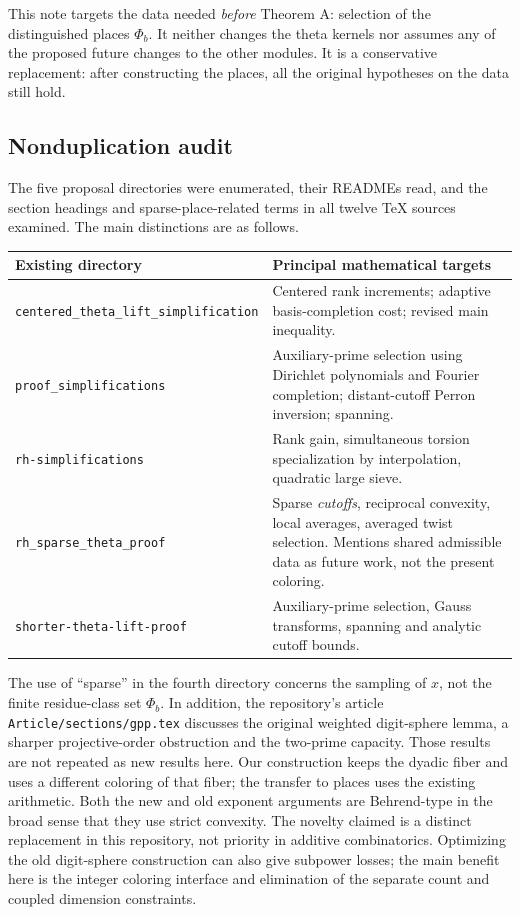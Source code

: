 \documentclass[11pt]{article}
\theoremstyle{remark}\newtheorem{remark}[theorem]{Remark}
\newcommand{\src}[1]{\texttt{#1}}
\begin{document}
This note targets the data needed \emph{before} Theorem A: selection of the distinguished places $\Phi_b$. It neither changes the theta kernels nor assumes any of the proposed future changes to the other modules. It is a conservative replacement: after constructing the places, all the original hypotheses on the data still hold.

\subsection{Nonduplication audit}
The five proposal directories were enumerated, their READMEs read, and the section headings and sparse-place-related terms in all twelve TeX sources examined. The main distinctions are as follows.
\begin{center}\small
\begin{tabularx}{\linewidth}{@{}p{.32\linewidth}X@{}}
\toprule
Existing directory & Principal mathematical targets \\
\midrule
\src{centered\_theta\_lift\_}\newline\src{simplification} & Centered rank increments; adaptive basis-completion cost; revised main inequality. \\
\src{proof\_simplifications} & Auxiliary-prime selection using Dirichlet polynomials and Fourier completion; distant-cutoff Perron inversion; spanning. \\
\src{rh-simplifications} & Rank gain, simultaneous torsion specialization by interpolation, quadratic large sieve. \\
\src{rh\_sparse\_theta\_proof} & Sparse \emph{cutoffs}, reciprocal convexity, local averages, averaged twist selection. Mentions shared admissible data as future work, not the present coloring. \\
\src{shorter-theta-lift-proof} & Auxiliary-prime selection, Gauss transforms, spanning and analytic cutoff bounds. \\
\bottomrule
\end{tabularx}
\end{center}
The use of ``sparse'' in the fourth directory concerns the sampling of $x$, not the finite residue-class set $\Phi_b$. In addition, the repository's article \src{Article/sections/gpp.tex} discusses the original weighted digit-sphere lemma, a sharper projective-order obstruction and the two-prime capacity. Those results are not repeated as new results here. Our construction keeps the dyadic fiber and uses a different coloring of that fiber; the transfer to places uses the existing arithmetic. Both the new and old exponent arguments are Behrend-type in the broad sense that they use strict convexity. The novelty claimed is a distinct replacement in this repository, not priority in additive combinatorics. Optimizing the old digit-sphere construction can also give subpower losses; the main benefit here is the integer coloring interface and elimination of the separate count and coupled dimension constraints.
\end{document}
